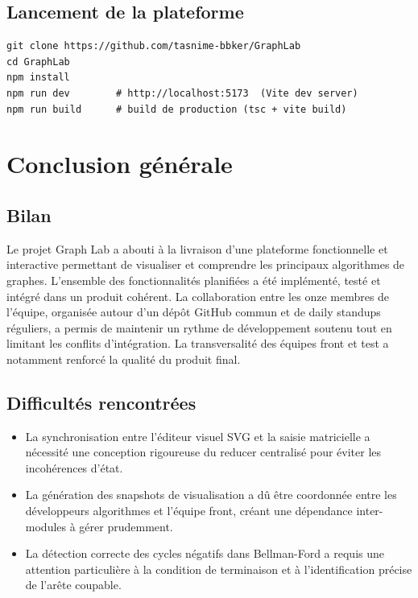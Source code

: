\documentclass[a4paper,12pt]{report}
\begin{document}
\section{Lancement de la plateforme}
 
\begin{verbatim}
git clone https://github.com/tasnime-bbker/GraphLab
cd GraphLab
npm install
npm run dev        # http://localhost:5173  (Vite dev server)
npm run build      # build de production (tsc + vite build)
\end{verbatim}
 
\clearpage


\clearpage


\chapter*{Conclusion générale}

\section*{Bilan}

Le projet Graph Lab a abouti à la livraison d'une plateforme fonctionnelle et interactive
permettant de visualiser et comprendre les principaux algorithmes de graphes. L'ensemble
des fonctionnalités planifiées a été implémenté, testé et intégré dans un produit cohérent.
La collaboration entre les onze membres de l'équipe, organisée autour d'un dépôt GitHub
commun et de daily standups réguliers, a permis de maintenir un rythme de développement
soutenu tout en limitant les conflits d'intégration. La transversalité des équipes front
et test a notamment renforcé la qualité du produit final.

\section*{Difficultés rencontrées}

\begin{itemize}
    \item La synchronisation entre l'éditeur visuel SVG et la saisie matricielle a nécessité
          une conception rigoureuse du reducer centralisé pour éviter les incohérences d'état.
    \item La génération des snapshots de visualisation a dû être coordonnée entre les développeurs
          algorithmes et l'équipe front, créant une dépendance inter-modules à gérer prudemment.
    \item La détection correcte des cycles négatifs dans Bellman-Ford a requis une attention
          particulière à la condition de terminaison et à l'identification précise de l'arête coupable.
\end{itemize}
\end{document}
